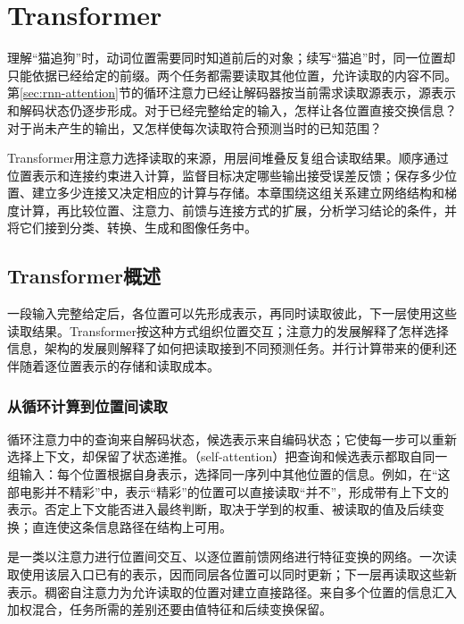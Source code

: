 \chapter{Transformer}
\label{chap:transformer}

理解“猫追狗”时，动词位置需要同时知道前后的对象；续写“猫追”时，同一位置却只能依据已经给定的前缀。两个任务都需要读取其他位置，允许读取的内容不同。第\ref{sec:rnn-attention}节的循环注意力已经让解码器按当前需求读取源表示，源表示和解码状态仍逐步形成。对于已经完整给定的输入，怎样让各位置直接交换信息？对于尚未产生的输出，又怎样使每次读取符合预测当时的已知范围？

Transformer用注意力选择读取的来源，用层间堆叠反复组合读取结果。顺序通过位置表示和连接约束进入计算，监督目标决定哪些输出接受误差反馈；保存多少位置、建立多少连接又决定相应的计算与存储。本章围绕这组关系建立网络结构和梯度计算，再比较位置、注意力、前馈与连接方式的扩展，分析学习结论的条件，并将它们接到分类、转换、生成和图像任务中。

\section{Transformer概述}
\label{sec:transformer-overview}

一段输入完整给定后，各位置可以先形成表示，再同时读取彼此，下一层使用这些读取结果。Transformer按这种方式组织位置交互；注意力的发展解释了怎样选择信息，架构的发展则解释了如何把读取接到不同预测任务。并行计算带来的便利还伴随着逐位置表示的存储和读取成本。

\subsection{从循环计算到位置间读取}
\label{sec:transformer-core-idea}

循环注意力中的查询来自解码状态，候选表示来自编码状态；它使每一步可以重新选择上下文，却保留了状态递推。（self-attention）把查询和候选表示都取自同一组输入：每个位置根据自身表示，选择同一序列中其他位置的信息。例如，在“这部电影并不精彩”中，表示“精彩”的位置可以直接读取“并不”，形成带有上下文的表示。否定上下文能否进入最终判断，取决于学到的权重、被读取的值及后续变换；直连使这条信息路径在结构上可用。

是一类以注意力进行位置间交互、以逐位置前馈网络进行特征变换的网络。一次读取使用该层入口已有的表示，因而同层各位置可以同时更新；下一层再读取这些新表示。稠密自注意力为允许读取的位置对建立直接路径。来自多个位置的信息汇入加权混合，任务所需的差别还要由值特征和后续变换保留。

